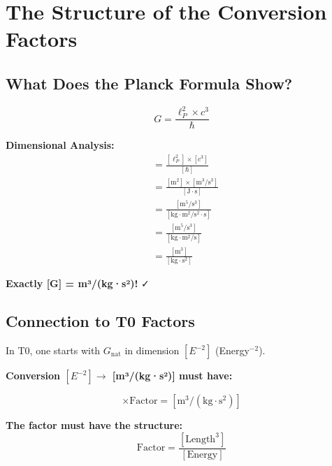 	\section{The Structure of the Conversion Factors}
	
	\subsection{What Does the Planck Formula Show?}
	
	\begin{formula}
		\begin{equation}
			\boxed{G = \frac{\ell_P^2 \times c^3}{\hbar}}
		\end{equation}
		
		\textbf{Dimensional Analysis:}
		\begin{align}
			[G] &= \frac{[\ell_P^2] \times [c^3]}{[\hbar]} \\
			&= \frac{[\text{m}^2] \times [\text{m}^3/\text{s}^3]}{[\text{J} \cdot \text{s}]} \\
			&= \frac{[\text{m}^5/\text{s}^3]}{[\text{kg} \cdot \text{m}^2/\text{s}^2 \cdot \text{s}]} \\
			&= \frac{[\text{m}^5/\text{s}^3]}{[\text{kg} \cdot \text{m}^2/\text{s}]} \\
			&= \frac{[\text{m}^3]}{[\text{kg} \cdot \text{s}^2]}
		\end{align}
		
		\textbf{Exactly [G] = m³/(kg·s²)!} ✓
	\end{formula}
	
	\subsection{Connection to T0 Factors}
	
	In T0, one starts with $G_{\text{nat}}$ in dimension $[E^{-2}]$ (Energy$^{-2}$).
	
	\textbf{Conversion $[E^{-2}] \to$ [m³/(kg·s²)] must have:}
	
	\begin{equation}
		[E^{-2}] \times \text{Factor} = [\text{m}^3/(\text{kg} \cdot \text{s}^2)]
	\end{equation}
	
	\textbf{The factor must have the structure:}
	\begin{equation}
		\text{Factor} = \frac{[\text{Length}^3]}{[\text{Energy}]}
	\end{equation}
	
